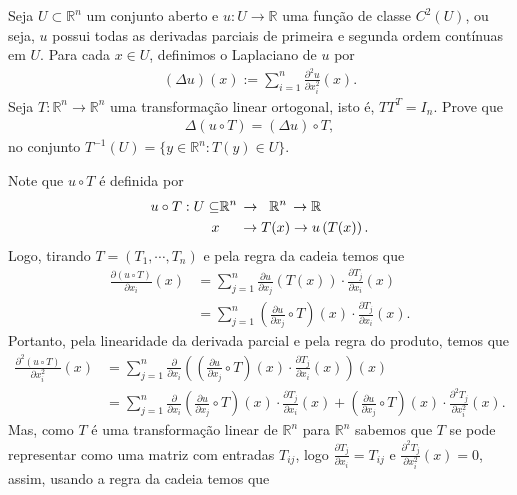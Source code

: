\begin{homeworkProblem}
  Seja $U \subset \mathbb{R}^n$ um conjunto aberto e $u : U \to \mathbb{R}$ uma função de classe $C^2(U)$, ou seja, $u$ possui todas as derivadas parciais de primeira e segunda ordem contínuas em $U$. Para cada $x \in U$, definimos o Laplaciano de $u$ por
    \begin{align*}
    (\Delta u)(x) := \sum_{i=1}^n \frac{\partial^2 u}{\partial x_i^2}(x).
    \end{align*}
    Seja $T : \mathbb{R}^n \to \mathbb{R}^n$ uma transformação linear ortogonal, isto é, $T T^T = I_n$. Prove que
    \begin{align*}
    \Delta (u \circ T) = (\Delta u) \circ T,
    \end{align*}
    no conjunto $T^{-1}(U) = \{y \in \mathbb{R}^n : T(y) \in U\}$.
  \begin{solution}
    Note que $u\circ T$ é definida por
    \begin{align*}
      u\circ T: U\subseteq & \mathbb{R}^{n}\,\to\hspace{0.2cm}\mathbb{R}^{n}\,\to\mathbb{R}\\
      x&\hspace{0.5cm}\to T(x)\to u\left(T(x)\right).
    \end{align*}
    Logo, tirando $T=(T_1,\cdots,T_n)$ e pela regra da cadeia temos que
    \begin{align*}
      \frac{\partial (u\circ T)}{\partial x_i}(x)&=\sum_{j=1}^{n}\frac{\partial u}{\partial x_j}(T(x))\cdot \frac{\partial T_j}{\partial x_i}(x)\\
      &=\sum_{j=1}^{n}\left( \frac{\partial u}{\partial x_j}\circ T \right)(x)\cdot \frac{\partial T_j}{\partial x_i}(x).
    \end{align*}
    Portanto, pela linearidade da derivada parcial e pela regra do produto, temos que
    \begin{align*}
      \frac{\partial^{2} (u\circ T)}{\partial x_i^{2}}(x)&=\sum_{j=1}^{n}\frac{\partial }{\partial x_i}\left(\left( \frac{\partial u}{\partial x_j}\circ T \right)(x)\cdot \frac{\partial T_j}{\partial x_i}(x)\right)(x)\\
      &=\sum_{j=1}^{n}\frac{\partial }{\partial x_i}\left( \frac{\partial u}{\partial x_j}\circ T \right)(x)\cdot \frac{\partial T_j}{\partial x_i}(x)+\left( \frac{\partial u}{\partial x_j}\circ T \right)(x)\cdot \frac{\partial^{2} T_j}{\partial x_i^{2}}(x).
    \end{align*}
    Mas, como $T$ é uma transformação linear de $\mathbb{R}^{n}$ para $\mathbb{R}^{n}$ sabemos que $T$ se pode representar como uma matriz com entradas $T_{ij}$, logo $\displaystyle \frac{\partial T_j}{\partial x_i}=T_{ij}$ e $\displaystyle \frac{\partial^{2} T_j}{\partial x_i^{2}}(x)=0$, assim, usando a regra da cadeia temos que

\end{solution}
\end{homeworkProblem}

